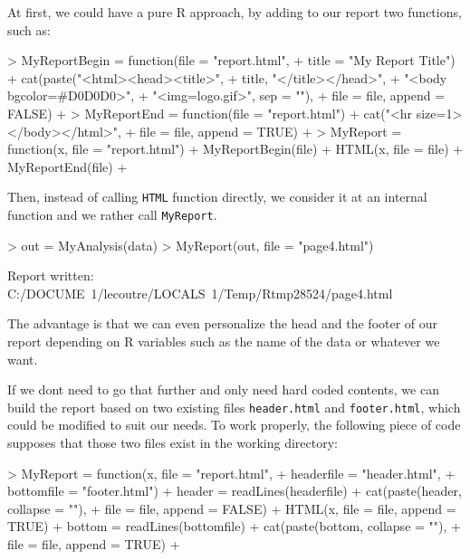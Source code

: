 \documentclass[a4paper]{article}
\begin{document}
At first, we could have a pure R approach, by adding to our report two functions, such as:


\begin{Schunk}
\begin{Sinput}
> MyReportBegin = function(file = "report.html", 
+     title = "My Report Title") {
+     cat(paste("<html><head><title>", 
+         title, "</title></head>", 
+         "<body bgcolor=#D0D0D0>", 
+         "<img=logo.gif>", sep = ""), 
+         file = file, append = FALSE)
+ }
> MyReportEnd = function(file = "report.html") {
+     cat("<hr size=1></body></html>", 
+         file = file, append = TRUE)
+ }
> MyReport = function(x, file = "report.html") {
+     MyReportBegin(file)
+     HTML(x, file = file)
+     MyReportEnd(file)
+ }
\end{Sinput}
\end{Schunk}


Then, instead of calling \verb+HTML+ function directly, we consider it at an internal function and we rather call \verb+MyReport+.

\begin{Schunk}
\begin{Sinput}
> out = MyAnalysis(data)
> MyReport(out, file = "page4.html")
\end{Sinput}
\begin{Soutput}
Report written: C:/DOCUME~1/lecoutre/LOCALS~1/Temp/Rtmp28524/page4.html
\end{Soutput}
\end{Schunk}

The advantage is that we can even personalize the head and the footer of our report depending on R variables such as the name of the data or whatever we want. 

If we dont need to go that further and only need hard coded contents, we can build the report based on two existing files \verb+header.html+ and \verb+footer.html+, which could be modified to suit our needs. To work properly, the following piece of code supposes that those two files exist in the working directory:

\begin{Schunk}
\begin{Sinput}
> MyReport = function(x, file = "report.html", 
+     headerfile = "header.html", 
+     bottomfile = "footer.html") {
+     header = readLines(headerfile)
+     cat(paste(header, collapse = "\n"), 
+         file = file, append = FALSE)
+     HTML(x, file = file, append = TRUE)
+     bottom = readLines(bottomfile)
+     cat(paste(bottom, collapse = "\n"), 
+         file = file, append = TRUE)
+ }
\end{Sinput}
\end{Schunk}
\end{document}
